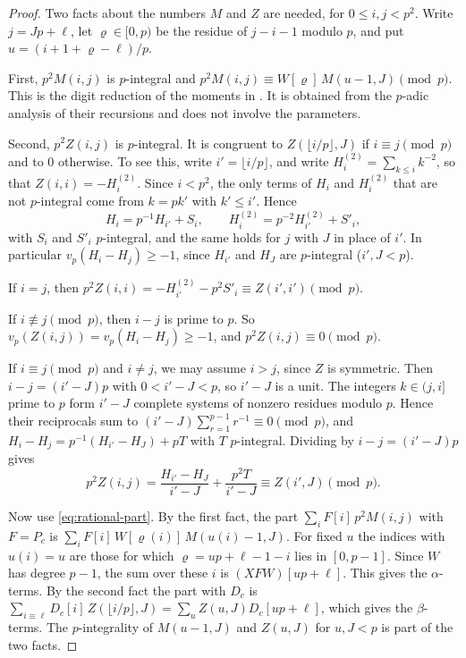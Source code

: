 \begin{proof}
Two facts about the numbers $M$ and $Z$ are needed, for $0\le i,j<p^2$. Write $j=Jp+\ell$, let
$\varrho\in[0,p)$ be the residue of $j-i-1$ modulo $p$, and put $u=(i+1+\varrho-\ell)/p$.

First, $p^2M(i,j)$ is $p$-integral and $p^2M(i,j)\equiv W[\varrho]\,M(u-1,J)\pmod p$. This is the digit
reduction of the moments in \cite[\S3]{OpenAI2026}. It is obtained from the $p$-adic analysis of their
recursions and does not involve the parameters.

Second, $p^2Z(i,j)$ is $p$-integral. It is congruent to $Z(\lfloor i/p\rfloor,J)$ if $i\equiv j\pmod p$ and
to $0$ otherwise. To see this, write $i'=\lfloor i/p\rfloor$, and write $H^{(2)}_i=\sum_{k\le i}k^{-2}$, so
that $Z(i,i)=-H^{(2)}_i$. Since $i<p^2$, the only terms of $H_i$ and $H^{(2)}_i$ that are not $p$-integral
come from $k=pk'$ with $k'\le i'$. Hence
\[
 H_i=p^{-1}H_{i'}+S_i,\qquad H^{(2)}_i=p^{-2}H^{(2)}_{i'}+S'_i,
\]
with $S_i$ and $S'_i$ $p$-integral, and the same holds for $j$ with $J$ in place of $i'$. In particular
$v_p(H_i-H_j)\ge-1$, since $H_{i'}$ and $H_J$ are $p$-integral ($i',J<p$).

If $i=j$, then $p^2Z(i,i)=-H^{(2)}_{i'}-p^2S'_i\equiv Z(i',i')\pmod p$.

If $i\not\equiv j\pmod p$, then $i-j$ is prime to $p$. So $v_p(Z(i,j))=v_p(H_i-H_j)\ge-1$, and
$p^2Z(i,j)\equiv0\pmod p$.

If $i\equiv j\pmod p$ and $i\ne j$, we may assume $i>j$, since $Z$ is symmetric. Then $i-j=(i'-J)p$
with $0<i'-J<p$, so $i'-J$ is a unit. The integers $k\in(j,i]$ prime to $p$ form $i'-J$ complete systems
of nonzero residues modulo $p$. Hence their reciprocals sum to $(i'-J)\sum_{r=1}^{p-1}r^{-1}\equiv0\pmod p$,
and $H_i-H_j=p^{-1}(H_{i'}-H_J)+pT$ with $T$ $p$-integral. Dividing by $i-j=(i'-J)p$ gives
\[
 p^2Z(i,j)=\frac{H_{i'}-H_J}{i'-J}+\frac{p^2T}{i'-J}\equiv Z(i',J)\pmod p .
\]

Now use \eqref{eq:rational-part}. By the first fact, the part $\sum_iF[i]\,p^2M(i,j)$ with $F=P_c$ is
$\sum_iF[i]\,W[\varrho(i)]\,M(u(i)-1,J)$. For fixed $u$ the indices with $u(i)=u$ are those for which
$\varrho=up+\ell-1-i$ lies in $[0,p-1]$. Since $W$ has degree $p-1$, the sum over these $i$ is
$(XFW)[up+\ell]$. This gives the $\alpha$-terms. By the second fact the part with $D_c$ is
$\sum_{i\equiv\ell}D_c[i]\,Z(\lfloor i/p\rfloor,J)=\sum_uZ(u,J)D_c[up+\ell]$, which gives the $\beta$-terms.
The $p$-integrality of $M(u-1,J)$ and $Z(u,J)$ for $u,J<p$ is part of the two facts.
\end{proof}

